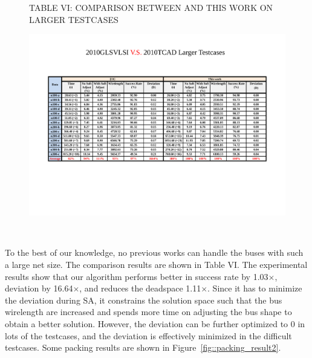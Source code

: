 \begin{figure}[htb]
{
  \centering
  \scriptsize
   TABLE VI: COMPARISON BETWEEN \cite{PH10} AND THIS WORK ON LARGER TESTCASES
   \centerline{\includegraphics[width=17cm]{Fig/table_6.pdf}}\\
  \label{fig::table6}
}
\end{figure}

To the best of our knowledge, no previous works can handle the buses with
such a large net size.
The comparison results are shown in Table VI.
The experimental results show that our algorithm performs better in success rate by 1.03$\times$,
deviation by 16.64$\times$, and reduces the deadspace 1.11$\times$.
Since it has to minimize the deviation during SA, it constrains the solution
space such that the bus wirelength are increased and spends more time on adjusting
the bus shape to obtain a better solution. However, the deviation can be further optimized to 0 in lots of
the testcases, and the deviation is effectively minimized in the difficult testcases.
Some packing results are shown in Figure~\ref{fig::packing_result2}.

